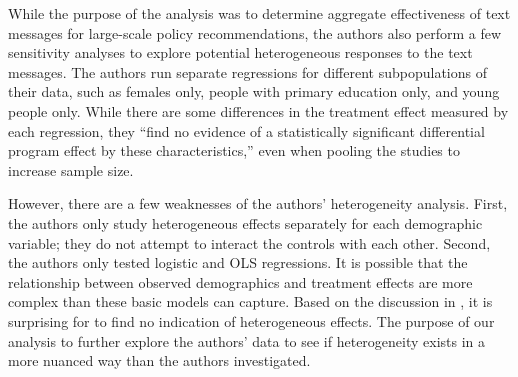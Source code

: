\documentclass[12pt]{article}
\begin{document}
While the purpose of the \textcite{fabregas_digital_2025} analysis was to determine aggregate effectiveness of text messages for large-scale policy recommendations, the authors also perform a few sensitivity analyses to explore potential heterogeneous responses to the text messages. The authors run separate regressions for different subpopulations of their data, such as females only, people with primary education only, and young people only. While there are some differences in the treatment effect measured by each regression, they ``find no evidence of a statistically significant differential program effect by these characteristics,'' even when pooling the studies to increase sample size. 

However, there are a few weaknesses of the authors' heterogeneity analysis. First, the authors only study heterogeneous effects separately for each demographic variable; they do not attempt to interact the controls with each other. Second, the authors only tested logistic and OLS regressions. It is possible that the relationship between observed demographics and treatment effects are more complex than these basic models can capture. Based on the discussion in \textcite{aker_promise_2016}, it is surprising for \textcite{fabregas_digital_2025} to find no indication of heterogeneous effects. The purpose of our analysis to further explore the authors' data to see if heterogeneity exists in a more nuanced way than the authors investigated.

\newpage
\printbibliography
\newpage
\end{document}
